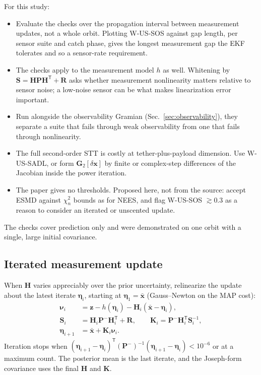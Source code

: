 \documentclass[11pt]{article}
\newcommand{\x}{\bm{x}}
\newcommand{\Pm}{\bm{P}}
\newcommand{\Sm}{\bm{S}}
\newcommand{\Hm}{\bm{H}}
\newcommand{\Km}{\bm{K}}
\newcommand{\Rm}{\bm{R}}
\newcommand{\T}{^{\mathsf{T}}}
\begin{document}
For this study:
\begin{itemize}
  \item Evaluate the checks over the propagation interval between measurement updates,
        not a whole orbit. Plotting W-US-SOS against gap length, per sensor suite and catch
        phase, gives the longest measurement gap the EKF tolerates and so a sensor-rate
        requirement.
  \item The checks apply to the measurement model $h$ as well. Whitening by
        $\Sm = \Hm\Pm\Hm\T + \Rm$ asks whether measurement nonlinearity matters relative to
        sensor noise; a low-noise sensor can be what makes linearization error important.
  \item Run alongside the observability Gramian (Sec.~\ref{sec:observability}), they
        separate a suite that fails through weak observability from one that fails through
        nonlinearity.
  \item The full second-order STT is costly at tether-plus-payload dimension. Use
        W-US-SADL, or form $\bm{G}_2[\delta\x]$ by finite or complex-step differences of
        the Jacobian inside the power iteration.
  \item The paper gives no thresholds. Proposed here, not from the source: accept ESMD
        against $\chi^2_n$ bounds as for NEES, and flag W-US-SOS $\gtrsim 0.3$ as a reason to
        consider an iterated or unscented update.
\end{itemize}
The checks cover prediction only and were demonstrated on one orbit with a single, large
initial covariance.

\subsection{Iterated measurement update}
\label{sec:iekf}
When $\Hm$ varies appreciably over the prior uncertainty, relinearize the update about the
latest iterate $\bm{\eta}_i$, starting at $\bm{\eta}_1=\bar{\x}$ (Gauss--Newton on the
MAP cost):
\begin{align}
  \bm{\nu}_i &= \bm{z} - h(\bm{\eta}_i) - \Hm_i(\bar{\x} - \bm{\eta}_i), \\
  \Sm_i &= \Hm_i\Pm^-\Hm_i\T + \Rm, \qquad
  \Km_i = \Pm^-\Hm_i\T\Sm_i^{-1}, \\
  \bm{\eta}_{i+1} &= \bar{\x} + \Km_i\bm{\nu}_i .
\end{align}
Iteration stops when
$(\bm{\eta}_{i+1}-\bm{\eta}_i)\T(\Pm^-)^{-1}(\bm{\eta}_{i+1}-\bm{\eta}_i)<10^{-6}$ or at
a maximum count. The posterior mean is the last iterate, and the Joseph-form covariance
uses the final $\Hm$ and $\Km$.
\end{document}
